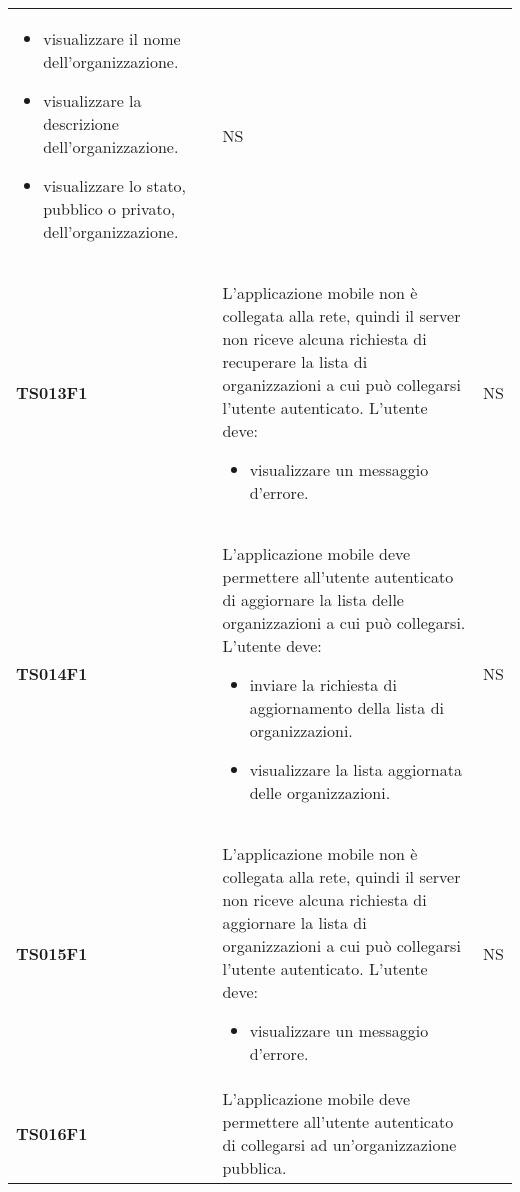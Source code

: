 \documentclass[../piano-di-qualifica.tex]{subfiles}
\begin{document}
\begin{centering}
\begin{longtable}[H]{>{\centering\bfseries}m{3cm} >{}p{10cm} >{\centering\arraybackslash}m{3cm}}
\begin{itemize}
                        \item visualizzare il nome dell'organizzazione.
                        \item visualizzare la descrizione dell'organizzazione.
                        \item visualizzare lo stato, pubblico o privato, dell'organizzazione.
                      \end{itemize}
                    & NS \\
        TS013F1     & L'applicazione mobile non è collegata alla rete, quindi il server non riceve alcuna richiesta di recuperare la lista di organizzazioni a cui può collegarsi l'utente autenticato. \newline
                      L'utente deve:
                      \begin{itemize}
                        \item visualizzare un messaggio d'errore.
                      \end{itemize}
                    & NS \\
        TS014F1     & L'applicazione mobile deve permettere all'utente autenticato di aggiornare la lista delle organizzazioni a cui può collegarsi. \newline
                      L'utente deve:
                      \begin{itemize}
                        \item inviare la richiesta di aggiornamento della lista di organizzazioni.
                        \item visualizzare la lista aggiornata delle organizzazioni.
                      \end{itemize}
                    & NS \\
        TS015F1     & L'applicazione mobile non è collegata alla rete, quindi il server non riceve alcuna richiesta di aggiornare la lista di organizzazioni a cui può collegarsi l'utente autenticato. \newline
                      L'utente deve:
                      \begin{itemize}
                        \item visualizzare un messaggio d'errore.
                      \end{itemize}
                    & NS \\
        TS016F1     & L'applicazione mobile deve permettere all'utente autenticato di collegarsi ad un'organizzazione pubblica. \newline

\end{longtable}
\end{centering}
\end{document}

